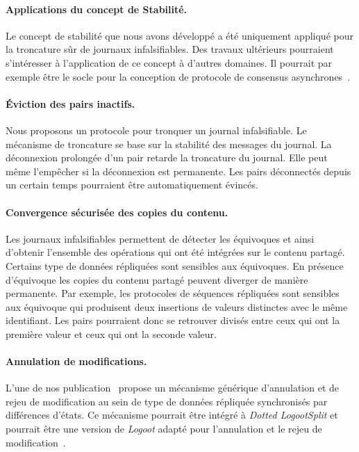 \paragraph{Applications du concept de Stabilité.} Le concept de stabilité que nous avons développé a été uniquement appliqué pour la troncature sûr de journaux infalsifiables.
Des travaux ultérieurs pourraient s'intéresser à l'application de ce concept à d'autres domaines.
Il pourrait par exemple être le socle pour la conception de protocole de consensus asynchrones~\autocite{bracha1985asynchronous}.

\paragraph{Éviction des pairs inactifs.}
Nous proposons un protocole pour tronquer un journal infalsifiable.
Le mécanisme de troncature se base sur la stabilité des messages du journal.
La déconnexion prolongée d'un pair retarde la troncature du journal.
Elle peut même l'empêcher si la déconnexion est permanente.
Les pairs déconnectés depuis un certain temps pourraient être automatiquement évincés.

\paragraph{Convergence sécurisée des copies du contenu.} Les journaux infalsifiables permettent de détecter les équivoques et ainsi d'obtenir l'ensemble des opérations qui ont été intégrées sur le contenu partagé.
Certains type de données répliquées sont sensibles aux équivoques.
En présence d'équivoque les copies du contenu partagé peuvent diverger de manière permanente.
Par exemple, les protocoles de séquences répliquées sont sensibles aux équivoque qui produisent deux insertions de valeurs distinctes avec le même identifiant.
Les pairs pourraient donc se retrouver divisés entre ceux qui ont la première valeur et ceux qui ont la seconde valeur.

\paragraph{Annulation de modifications.} L'une de nos publication~\autocite{2019_yu_genericundo} propose un mécanisme générique d'annulation et de rejeu de modification au sein de type de données répliquée synchronisés par différences d'états.
Ce mécanisme pourrait être intégré à \emph{Dotted LogootSplit} et pourrait être une version de \emph{Logoot} adapté pour l'annulation et le rejeu de modification~\autocite{weiss2010logoot}.

